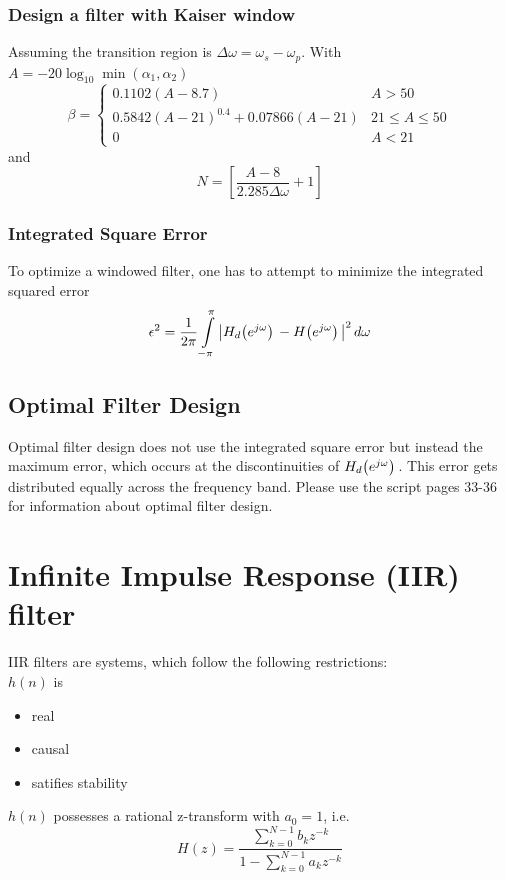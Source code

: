 \documentclass[accentcolor=tud4c,9.5pt,nochapname,bigchapter,paper=a5report]{tudreport}
\begin{document}
\subsubsection{Design a filter with Kaiser window}
Assuming the transition region is $\Delta\omega = \omega_s-\omega_p$. With $A = -20\log_{10}\min(\alpha_1,\alpha_2)$
\begin{equation}
\beta = \begin{cases}
0.1102(A-8.7) &A>50 \\
0.5842(A-21)^{0.4}+0.07866(A-21) &21\leq A \leq 50 \\
0 &A<21
\end{cases}
\end{equation}
and
\begin{equation}
N=\left[\frac{A-8}{2.285\Delta\omega}+1\right]
\end{equation}
\subsubsection{Integrated Square Error}
To optimize a windowed filter, one has to attempt to minimize the integrated squared error
\begin{equation}
\epsilon^2=\frac{1}{2\pi}\int\limits_{-\pi}^{\pi}\left|H_d{\left(e^{j\omega}\right)}\, - H{\left(e^{j\omega}\right)}\,\right|^2 d\omega
\end{equation}

\subsection{Optimal Filter Design}
Optimal filter design does not use the integrated square error but instead the maximum error, which occurs at the discontinuities of $H_d{\left(e^{j\omega}\right)}\,$.
This error gets distributed equally across the frequency band.
Please use the script pages 33-36 for information about optimal filter design.

\section{Infinite Impulse Response (IIR) filter}
IIR filters are systems, which follow the following restrictions:\\
$h(n)$ is
  \begin{itemize}
  	\item real
  	\item causal
  	\item satifies stability
  \end{itemize}
$h(n)$ possesses a rational z-transform with $a_0=1$, i.e.
\begin{equation}
  	H(z)=\frac{\sum\limits_{k=0}^{N-1} b_k z^{-k}}{1-\sum\limits_{k=0}^{N-1} a_k z^{-k}}
\end{equation}
  
\end{document}
